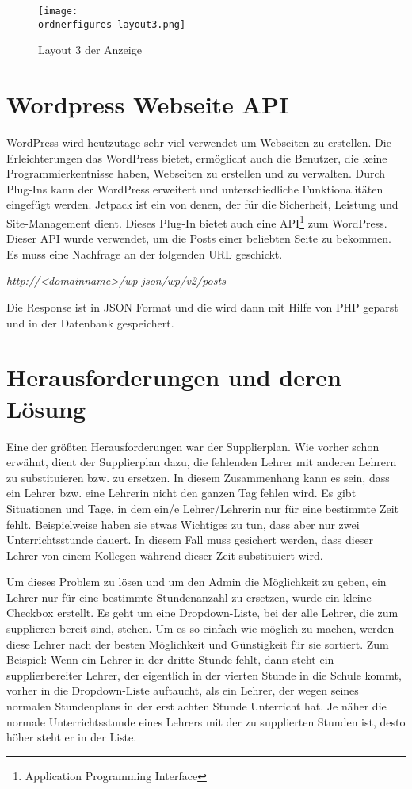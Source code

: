 \begin{figure}[H]
	\centering
	\texttt{[image: \\ordnerfigures layout3.png]}
	\caption{Layout 3 der Anzeige}
	\label{fi:layout3}
\end{figure}


\section{Wordpress Webseite API}


WordPress wird heutzutage sehr viel verwendet um Webseiten zu erstellen. Die Erleichterungen das WordPress bietet, ermöglicht auch die Benutzer, die keine Programmierkentnisse haben, Webseiten zu erstellen und zu verwalten. Durch Plug-Ins kann der WordPress erweitert und unterschiedliche Funktionalitäten eingefügt werden. Jetpack ist ein von denen, der für die Sicherheit, Leistung und Site-Management dient. Dieses Plug-In bietet auch eine API\footnote{Application Programming Interface} zum WordPress. Dieser API wurde verwendet, um die Posts einer beliebten Seite zu bekommen. Es muss eine Nachfrage an der folgenden URL geschickt.


\begin{center}
	\textit{http://\textless{}\textit{domainname}\textgreater{}/wp-json/wp/v2/posts}
	
\end{center}


Die Response ist in JSON Format und die wird dann mit Hilfe von PHP geparst und in der Datenbank gespeichert. 


\section{Herausforderungen und deren Lösung}

Eine der größten Herausforderungen war der Supplierplan. Wie vorher schon erwähnt, dient der Supplierplan  dazu, die fehlenden Lehrer mit anderen Lehrern zu substituieren bzw. zu ersetzen. In diesem Zusammenhang kann es sein, dass ein Lehrer bzw. eine Lehrerin nicht den ganzen Tag fehlen wird. Es gibt Situationen und Tage, in dem ein/e Lehrer/Lehrerin nur für eine bestimmte Zeit fehlt. Beispielweise haben sie etwas Wichtiges zu tun, dass aber nur zwei Unterrichtsstunde dauert. In diesem Fall muss gesichert werden, dass dieser Lehrer von einem Kollegen während dieser Zeit substituiert wird.


Um dieses Problem zu lösen und um den Admin die Möglichkeit zu geben, ein Lehrer nur für eine bestimmte Stundenanzahl zu ersetzen, wurde ein kleine Checkbox erstellt. Es geht um eine Dropdown-Liste, bei der alle Lehrer, die zum supplieren bereit sind, stehen. Um es so einfach wie möglich zu machen, werden diese Lehrer nach der besten Möglichkeit und Günstigkeit für sie sortiert. Zum Beispiel:  Wenn ein Lehrer in der dritte Stunde fehlt, dann steht ein supplierbereiter Lehrer, der eigentlich in der vierten Stunde in die Schule kommt, vorher in die Dropdown-Liste auftaucht, als ein Lehrer, der wegen seines normalen Stundenplans in der erst achten Stunde Unterricht hat. Je näher die normale Unterrichtsstunde eines Lehrers mit der zu supplierten Stunden ist, desto höher steht er in der Liste.
